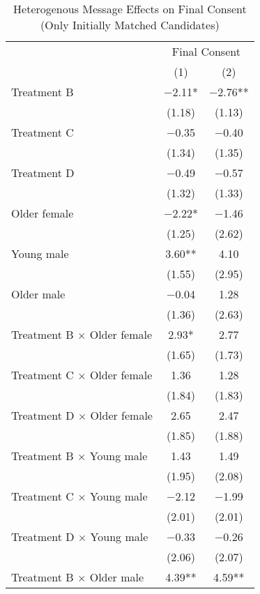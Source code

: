 \documentclass[12pt, a4paper]{article}
\begin{document}
\begin{table}[H]

\caption{\label{tab:lm-consent-interaction-init-reg}Heterogenous Message Effects on Final Consent (Only Initially Matched Candidates)}
\centering
\fontsize{8}{10}\selectfont
\begin{threeparttable}
\begin{tabular}[t]{lcc}
\toprule
\multicolumn{1}{c}{ } & \multicolumn{2}{c}{Final Consent} \\
\cmidrule(l{3pt}r{3pt}){2-3}
  & (1) & (2)\\
\midrule
Treatment B & \num{-2.11}* & \num{-2.76}**\\
 & (\num{1.18}) & (\num{1.13})\\
Treatment C & \num{-0.35} & \num{-0.40}\\
 & (\num{1.34}) & (\num{1.35})\\
Treatment D & \num{-0.49} & \num{-0.57}\\
 & (\num{1.32}) & (\num{1.33})\\
Older female & \num{-2.22}* & \num{-1.46}\\
 & (\num{1.25}) & (\num{2.62})\\
Young male & \num{3.60}** & \num{4.10}\\
 & (\num{1.55}) & (\num{2.95})\\
Older male & \num{-0.04} & \num{1.28}\\
 & (\num{1.36}) & (\num{2.63})\\
Treatment B $\times$ Older female & \num{2.93}* & \num{2.77}\\
 & (\num{1.65}) & (\num{1.73})\\
Treatment C $\times$ Older female & \num{1.36} & \num{1.28}\\
 & (\num{1.84}) & (\num{1.83})\\
Treatment D $\times$ Older female & \num{2.65} & \num{2.47}\\
 & (\num{1.85}) & (\num{1.88})\\
Treatment B $\times$ Young male & \num{1.43} & \num{1.49}\\
 & (\num{1.95}) & (\num{2.08})\\
Treatment C $\times$ Young male & \num{-2.12} & \num{-1.99}\\
 & (\num{2.01}) & (\num{2.01})\\
Treatment D $\times$ Young male & \num{-0.33} & \num{-0.26}\\
 & (\num{2.06}) & (\num{2.07})\\
Treatment B $\times$ Older male & \num{4.39}** & \num{4.59}**\\

\end{tabular}
\end{threeparttable}
\end{table}
\end{document}
